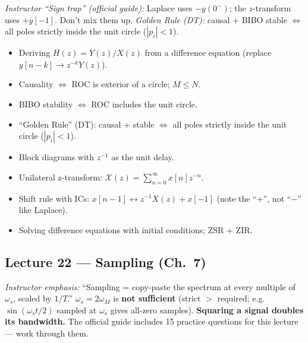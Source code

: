 \documentclass{article}
\begin{document}
\noindent\emph{Instructor ``Sign trap'' (official guide):} Laplace uses $-y(0^-)$; the $z$-transform uses \textbf{$+y[-1]$}. Don't mix them up. \emph{Golden Rule (DT):} causal + BIBO stable $\iff$ all poles strictly inside the unit circle ($|p_i| < 1$).

\begin{itemize}
  \item Deriving $H(z) = Y(z)/X(z)$ from a difference equation (replace $y[n-k] \to z^{-k}Y(z)$).
  \item Causality $\Leftrightarrow$ ROC is exterior of a circle; $M \le N$.
  \item BIBO stability $\Leftrightarrow$ ROC includes the unit circle.
  \item ``Golden Rule'' (DT): causal + stable $\Leftrightarrow$ all poles strictly inside the unit circle ($|p_i|<1$).
  \item Block diagrams with $z^{-1}$ as the unit delay.
  \item Unilateral z-transform: $\mathcal{X}(z) = \sum_{n=0}^\infty x[n]z^{-n}$.
  \item Shift rule with ICs: $x[n-1] \leftrightarrow z^{-1}X(z) + x[-1]$ (note the ``+'', not ``$-$'' like Laplace).
  \item Solving difference equations with initial conditions; ZSR + ZIR.
\end{itemize}

\subsection*{Lecture 22 --- Sampling (Ch.\ 7)}

\noindent\emph{Instructor emphasis:} ``Sampling = copy-paste the spectrum at every multiple of $\omega_s$, scaled by $1/T$.'' $\omega_s = 2\omega_M$ is \textbf{not sufficient} (strict $>$ required; e.g.\ $\sin(\omega_s t/2)$ sampled at $\omega_s$ gives all-zero samples). \textbf{Squaring a signal doubles its bandwidth.} The official guide includes 15 practice questions for this lecture --- work through them.
\end{document}
